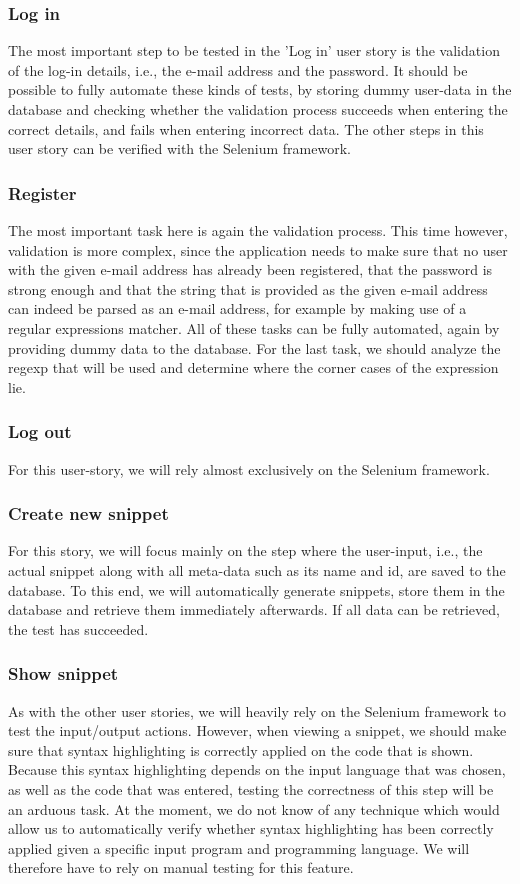 \documentclass {article}
\begin{document}
\subsubsection*{Log in}
The most important step to be tested in the 'Log in' user story is the validation of the log-in details, i.e., the e-mail address and the password.
It should be possible to fully automate these kinds of tests, by storing dummy user-data in the database and checking whether the validation process succeeds when entering the correct details, and fails when entering incorrect data.
The other steps in this user story can be verified with the Selenium framework.

\subsubsection*{Register}
The most important task here is again the validation process. This time however, validation is more complex, since the application needs to make sure that no user with the given e-mail address has already been registered, that the password is strong enough and that the string that is provided as the given e-mail address can indeed be parsed as an e-mail address, for example by making use of a regular expressions matcher.
All of these tasks can be fully automated, again by providing dummy data to the database. For the last task, we should analyze the regexp that will be used and determine where the corner cases of the expression lie.

\subsubsection*{Log out}
For this user-story, we will rely almost exclusively on the Selenium framework.

\subsubsection*{Create new snippet}
For this story, we will focus mainly on the step where the user-input, i.e., the actual snippet along with all meta-data such as its name and id, are saved to the database.
To this end, we will automatically generate snippets, store them in the database and retrieve them immediately afterwards. If all data can be retrieved, the test has succeeded.

\subsubsection*{Show snippet}
As with the other user stories, we will heavily rely on the Selenium framework to test the input/output actions. However, when viewing a snippet, we should make sure that syntax highlighting is correctly applied on the code that is shown.
Because this syntax highlighting depends on the input language that was chosen, as well as the code that was entered, testing the correctness of this step will be an arduous task.
At the moment, we do not know of any technique which would allow us to automatically verify whether syntax highlighting has been correctly applied given a specific input program and programming language.
We will therefore have to rely on manual testing for this feature.
\end{document}
